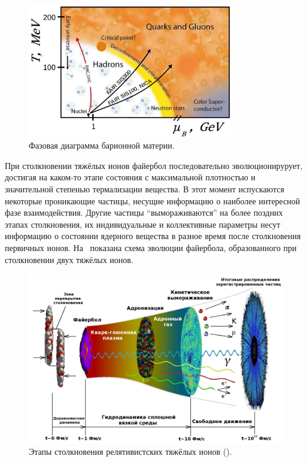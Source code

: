 \begin{figure}[H]
\centering
\includegraphics[width=0.8\textwidth]{pictures/QGP_phase_diag_3.png}
\caption{Фазовая диаграмма барионной материи.}
\label{fig:PhaseDiagram}
\end{figure}


При столкновении тяжёлых ионов файербол последовательно эволюционирурует, достигая на каком-то этапе состояния с максимальной плотностью и значительной степенью термализации вещества. В этот момент испускаются некоторые проникающие частицы, несущие информацию о наиболее интересной фазе взаимодействия. Другие частицы ``вымораживаются'' на более поздних этапах столкновения, их индивидуальные и коллективные параметры несут информацию о состоянии ядерного вещества в разное время после столкновения первичных ионов. На~ показана схема эволюции файербола, образованного при столкновении двух тяжёлых ионов.

\begin{figure}[H]
\centering
\includegraphics[width=1.0\textwidth]{pictures/little_bang_rus2.png}
\caption{Этапы столкновения релятивистских тяжёлых ионов (\cite{Chen}).}
\label{fig:LittleBang}
\end{figure}

